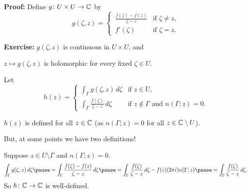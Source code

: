 \documentclass[10pt,aspectratio=169]{beamer}
\begin{document}
\begin{frame}
\textbf{Proof:}
Define $g \colon U \times U \to {\mathbb{C}}$ by
\[
g(\zeta,z) =
\begin{cases}
\,
\frac{f(\zeta)-f(z)}{\zeta-z} & \text{if } \zeta \not= z , \\
\,
f'(\zeta)                 & \text{if } \zeta = z .
\end{cases}
\]
\pause

\textbf{Exercise:}
$g(\zeta,z)$ is continuous in $U \times U$,
and 

\pause 
$z \mapsto g(\zeta,z)$ is holomorphic for every fixed $\zeta \in U$.

\medskip
\pause

Let
\vspace*{-5pt}
\[
h(z) = 
\begin{cases}
\int_\Gamma g(\zeta,z) \, d\zeta & \text{if } z \in U , \\
\int_\Gamma \frac{f(\zeta)}{\zeta-z} \, d\zeta & \text{if } z \not \in
\Gamma \text{ and } n(\Gamma;z) = 0 .
\end{cases}
\]
\pause

$h(z)$ is defined for all $z \in {\mathbb{C}}$ (as $n(\Gamma;z) = 0$ for all $z \in {\mathbb{C}}
\setminus U$).

\medskip
\pause

But, at some points we have two definitions!

\medskip
\pause

%

Suppose
$z \in U \setminus \Gamma$ and $n(\Gamma;z) = 0$.
\pause
\[
\int_\Gamma g(\zeta,z) \, d\zeta
\pause
=
\int_\Gamma \frac{f(\zeta)-f(z)}{\zeta-z} \, d\zeta
\pause
=
\int_\Gamma \frac{f(\zeta)}{\zeta-z} \, d\zeta
-
f(z) (2\pi i) n(\Gamma;z)
\pause
=
\int_\Gamma \frac{f(\zeta)}{\zeta-z} \, d\zeta .
\]
\pause
So $h \colon {\mathbb{C}} \to {\mathbb{C}}$ is well-defined.
\end{frame}
\end{document}

